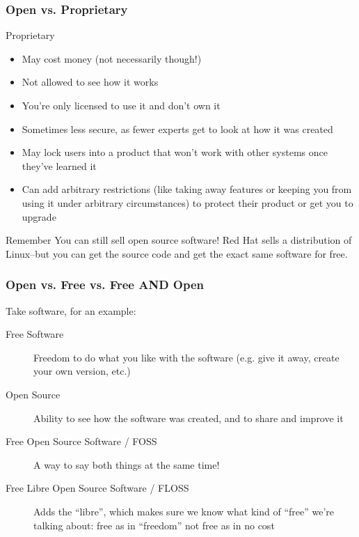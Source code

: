 \documentclass{beamer}
\begin{document}
\begin{frame}
  \frametitle{Open vs. Proprietary}
  
  Proprietary
  \begin{itemize}
  \item May cost \textcolor{beamer@mygreen}{money} (not necessarily though!)
  \item \textcolor{beamer@mygreen}{Not} allowed to see how it works
  \item You're only \textcolor{beamer@mygreen}{licensed} to use it and don't own it
  \item Sometimes less \textcolor{beamer@mygreen}{secure}, as fewer experts get to look at how it was created
  \item May \textcolor{beamer@mygreen}{lock} users into a product that won't work with other systems once they've learned it
  \item Can add arbitrary \textcolor{beamer@mygreen}{restrictions} (like taking away features or keeping you from using it under arbitrary circumstances) to protect their product or get you to upgrade
  \end{itemize}

  \begin{block}{Remember}
    You can still sell open source software! Red Hat sells a distribution of Linux--but you can get the source code and get the exact same software for free.
  \end{block}

\end{frame}

\begin{frame}
  \frametitle{Open vs. Free vs. Free AND Open}

  Take software, for an example: 

  \begin{description}
  \item[Free Software] Freedom to do what you like with the software (e.g. give it away, create your own version, etc.)
  \item[Open Source] Ability to see how the software was created, and to share and improve it
  \item[Free Open Source Software / FOSS] A way to say both things at the same time!
  \item[Free Libre Open Source Software / FLOSS] Adds the ``libre'', which makes sure we know what kind of ``free'' we're talking about: free as in ``freedom'' not free as in no cost
  \end{description}

\end{frame}
\end{document}

